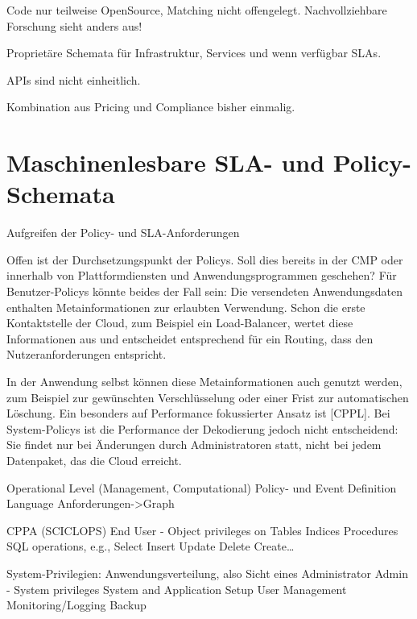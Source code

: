 Code nur teilweise OpenSource, Matching nicht offengelegt. Nachvollziehbare Forschung sieht anders aus!

Proprietäre Schemata für Infrastruktur, Services und wenn verfügbar SLAs. 

APIs sind nicht einheitlich.

Kombination aus Pricing und Compliance bisher einmalig.






\section{Maschinenlesbare SLA- und Policy-Schemata}

Aufgreifen der Policy- und SLA-Anforderungen

Offen ist der Durchsetzungspunkt der Policys. Soll dies bereits in der CMP oder innerhalb von Plattformdiensten und Anwendungsprogrammen geschehen? Für Benutzer-Policys könnte beides der Fall sein: Die versendeten Anwendungsdaten enthalten Metainformationen zur erlaubten Verwendung. Schon die erste Kontaktstelle der Cloud, zum Beispiel ein Load-Balancer, wertet diese Informationen aus und entscheidet entsprechend für ein Routing, dass den Nutzeranforderungen entspricht. 

In der Anwendung selbst können diese Metainformationen auch genutzt werden, zum Beispiel zur gewünschten Verschlüsselung oder einer Frist zur automatischen Löschung. Ein besonders auf Performance fokussierter Ansatz ist [CPPL]. Bei System-Policys ist die Performance der Dekodierung jedoch nicht entscheidend: Sie findet nur bei Änderungen durch Administratoren statt, nicht bei jedem Datenpaket, das die Cloud erreicht.

Operational Level (Management, Computational)
Policy- und Event Definition Language
Anforderungen->Graph



CPPA (SCICLOPS) End User - Object privileges on 
Tables 
Indices 
Procedures 
SQL operations, e.g.,  
Select 
Insert 
Update 
Delete 
Create… 

System-Privilegien: Anwendungsverteilung, also Sicht eines Administrator
Admin - System privileges 
System and Application Setup 
User Management
Monitoring/Logging
Backup

